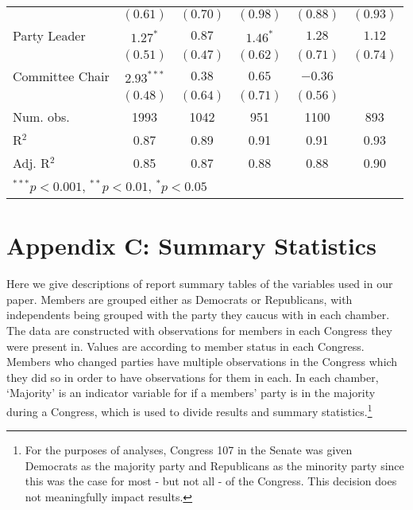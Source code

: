 \documentclass[12pt]{article}
\begin{document}
\begin{table}[H]
\begin{center}
\begin{tabular}{l c c c c c }
			& $(0.61)$      & $(0.70)$     & $(0.98)$      & $(0.88)$      & $(0.93)$     \\
			Party Leader                  & $1.27^{*}$    & $0.87$       & $1.46^{*}$    & $1.28$        & $1.12$       \\
			& $(0.51)$      & $(0.47)$     & $(0.62)$      & $(0.71)$      & $(0.74)$     \\
			Committee Chair                   & $2.93^{***}$  & $0.38$       & $0.65$        & $-0.36$       &              \\
			& $(0.48)$      & $(0.64)$     & $(0.71)$      & $(0.56)$      &              \\
			\hline
			Num. obs.               & 1993          & 1042         & 951           & 1100          & 893          \\
			R$^2$      & 0.87          & 0.89         & 0.91          & 0.91          & 0.93         \\
			Adj. R$^2$ & 0.85          & 0.87         & 0.88          & 0.88          & 0.90         \\
			\hline
			\multicolumn{6}{l}{\scriptsize{$^{***}p<0.001$, $^{**}p<0.01$, $^*p<0.05$}}
		\end{tabular}
	\end{center}
\end{table}

\section{Appendix C: Summary Statistics}

Here we give descriptions of report summary tables of the variables used in our paper. Members are grouped either as Democrats or Republicans, with independents being grouped with the party they caucus with in each chamber. The data are constructed with observations for members in each Congress they were present in. Values are according to member status in each Congress. Members who changed parties have multiple observations in the Congress which they did so in order to have observations for them in each. In each chamber, `Majority' is an indicator variable for if a members' party is in the majority during a Congress, which is used to divide results and summary statistics.\footnote{For the purposes of analyses, Congress 107 in the Senate was given Democrats as the majority party and Republicans as the minority party since this was the case for most - but not all - of the Congress. This decision does not meaningfully impact results.}
\end{document}
